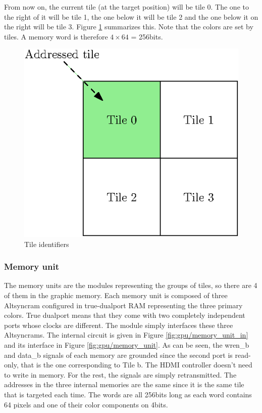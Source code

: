 From now on, the current tile (at the target position) will be tile 0. The one to the right of it
will be tile 1, the one below it will be tile 2 and the one below it on the right will be tile 3. 
Figure \ref{fig:gpu/tile_ids} summarizes this. Note that the colors are set by tiles. A memory word 
is therefore $4 \times 64$ = 256bits.

\begin{figure}[H]
    \centering
    \includegraphics[scale=1.0]{Chapter4-GPU_CLKU/res/tile_ids}
    \caption{Tile identifiers}
    \label{fig:gpu/tile_ids}
\end{figure}

\subsubsection*{Memory unit}

The memory units are the modules representing the groups of tiles, so there are 4 of them in the 
graphic memory. Each memory unit is composed of three Altsyncram configured in true-dualport RAM 
representing the three primary colors. True dualport means that they come with two completely 
independent ports whose clocks are different. The module simply interfaces these three Altsyncrams. 
The internal circuit is given in Figure \ref{fig:gpu/memory_unit_in} and its interface in Figure 
\ref{fig:gpu/memory_unit}. As can be seen, the wren\_b and data\_b signals 
of each memory are grounded since the second port is read-only, that is the one corresponding to
Tile b. The HDMI controller doesn't need to write in memory. For the rest, the signals are 
simply retransmitted. The addresses in the three internal memories are the same since it is the
same tile that is targeted each time. The words are all 256bits long as each word contains 64 
pixels and one of their color components on 4bits. 

